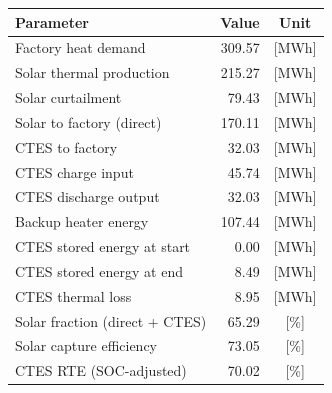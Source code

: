 \renewcommand{\arraystretch}{1.2}
\begin{table}[h]
\centering
\begin{tabular}{l|r c}
\hline
Parameter & Value & Unit \\
\hline
Factory heat demand & 309.57 & [MWh] \\
Solar thermal production & 215.27 & [MWh] \\
Solar curtailment & 79.43 & [MWh] \\
Solar to factory (direct) & 170.11 & [MWh] \\
CTES to factory & 32.03 & [MWh] \\
CTES charge input & 45.74 & [MWh] \\
CTES discharge output & 32.03 & [MWh] \\
Backup heater energy & 107.44 & [MWh] \\
CTES stored energy at start & 0.00 & [MWh] \\
CTES stored energy at end & 8.49 & [MWh] \\
CTES thermal loss & 8.95 & [MWh] \\
\hline
Solar fraction (direct + CTES) & 65.29 & [\%] \\
Solar capture efficiency & 73.05 & [\%] \\
CTES RTE (SOC-adjusted) & 70.02 & [\%] \\
\hline
\end{tabular}
\end{table}
